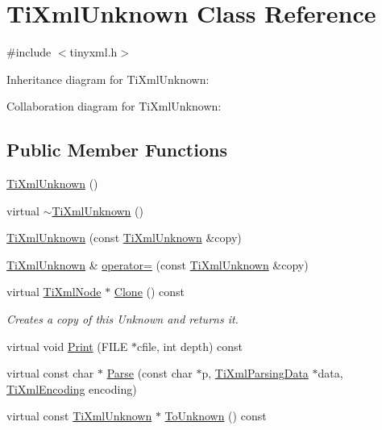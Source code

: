 \hypertarget{class_ti_xml_unknown}{\section{Ti\+Xml\+Unknown Class Reference}
\label{class_ti_xml_unknown}
}


{\ttfamily \#include $<$tinyxml.\+h$>$}



Inheritance diagram for Ti\+Xml\+Unknown\+:


Collaboration diagram for Ti\+Xml\+Unknown\+:
\subsection*{Public Member Functions}
\begin{DoxyCompactItemize}
\item 
\hyperlink{class_ti_xml_unknown_a945f09b3c6538099c69fc563216750c3}{Ti\+Xml\+Unknown} ()
\item 
virtual \hyperlink{class_ti_xml_unknown_ac21966c3b551553d760b4a339c9acda0}{$\sim$\+Ti\+Xml\+Unknown} ()
\item 
\hyperlink{class_ti_xml_unknown_abe798ff4feea31474850c7f0de6bdf5e}{Ti\+Xml\+Unknown} (const \hyperlink{class_ti_xml_unknown}{Ti\+Xml\+Unknown} \&copy)
\item 
\hyperlink{class_ti_xml_unknown}{Ti\+Xml\+Unknown} \& \hyperlink{class_ti_xml_unknown_a60560b5aacb4bdc8b2b5f02f0a99c5c0}{operator=} (const \hyperlink{class_ti_xml_unknown}{Ti\+Xml\+Unknown} \&copy)
\item 
virtual \hyperlink{class_ti_xml_node}{Ti\+Xml\+Node} $\ast$ \hyperlink{class_ti_xml_unknown_a675c4b2684af35e4c7649b7fd5ae598d}{Clone} () const 
\begin{DoxyCompactList}\small\item\em Creates a copy of this Unknown and returns it. \end{DoxyCompactList}\item 
virtual void \hyperlink{class_ti_xml_unknown_a025f19c21ef01ea9be50febb8fe0ba06}{Print} (F\+I\+L\+E $\ast$cfile, int depth) const 
\item 
virtual const char $\ast$ \hyperlink{class_ti_xml_unknown_aa51c2694e4177b5f0b5429ee5a81b58d}{Parse} (const char $\ast$p, \hyperlink{class_ti_xml_parsing_data}{Ti\+Xml\+Parsing\+Data} $\ast$data, \hyperlink{tinyxml_8h_a88d51847a13ee0f4b4d320d03d2c4d96}{Ti\+Xml\+Encoding} encoding)
\item 
virtual const \hyperlink{class_ti_xml_unknown}{Ti\+Xml\+Unknown} $\ast$ \hyperlink{class_ti_xml_unknown_ab0313e5fe77987d746ac1a97a254419d}{To\+Unknown} () const 

\end{DoxyCompactItemize}
